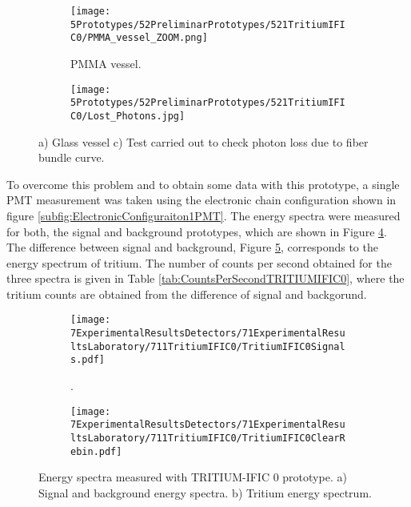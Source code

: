 \begin{figure}
\centering
    \begin{subfigure}[b]{0.45\textwidth}
    \centering
    \texttt{[image: 5Prototypes/52PreliminarPrototypes/521TritiumIFIC0/PMMA\_vessel\_ZOOM.png]}  
    \caption{PMMA vessel.\label{subfig:PMMAVesselToTestLostPhotons}}
    \end{subfigure}
    \hfill
    \begin{subfigure}[b]{0.45\textwidth}
    \centering
    \texttt{[image: 5Prototypes/52PreliminarPrototypes/521TritiumIFIC0/Lost\_Photons.jpg]}  
    \caption{\label{subfig:TestLostPhotons}}
    \end{subfigure}
 \caption{a) Glass vessel c) Test carried out to check photon loss due to fiber bundle curve.}
 \label{fig:TestLostPhotons}
\end{figure}

To overcome this problem and to obtain some data with this prototype, a single PMT measurement was taken using the electronic chain configuration shown in figure \ref{subfig:ElectronicConfiguraiton1PMT}. The energy spectra were measured for both, the signal and background prototypes, which are shown in Figure \ref{subfig:SignalBackgroundEnergySpectraTritiumIFIC0}. The difference between signal and background, Figure \ref{subfig:TritiumEnergySpectraTritiumIFIC0}, corresponds to the energy spectrum of tritium. The number of counts per second obtained for the three spectra is given in Table \ref{tab:CountsPerSecondTRITIUMIFIC0}, where the tritium counts are obtained from the difference of signal and backgorund.


\begin{figure}
\centering
    \begin{subfigure}[b]{1\textwidth}
    \centering
    \texttt{[image: 7ExperimentalResultsDetectors/71ExperimentalResultsLaboratory/711TritiumIFIC0/TritiumIFIC0Signals.pdf]}  
    \caption{.\label{subfig:SignalBackgroundEnergySpectraTritiumIFIC0}}
    \end{subfigure}
    \hfill
    \begin{subfigure}[b]{1\textwidth}
    \centering
    \texttt{[image: 7ExperimentalResultsDetectors/71ExperimentalResultsLaboratory/711TritiumIFIC0/TritiumIFIC0ClearRebin.pdf]}  
    \caption{\label{subfig:TritiumEnergySpectraTritiumIFIC0}}
    \end{subfigure}
 \caption{Energy spectra measured with TRITIUM-IFIC 0 prototype. a) Signal and background energy spectra. b) Tritium energy spectrum.}
 \label{fig:EnergySpectraTRITIUMIFIC0}
\end{figure}

